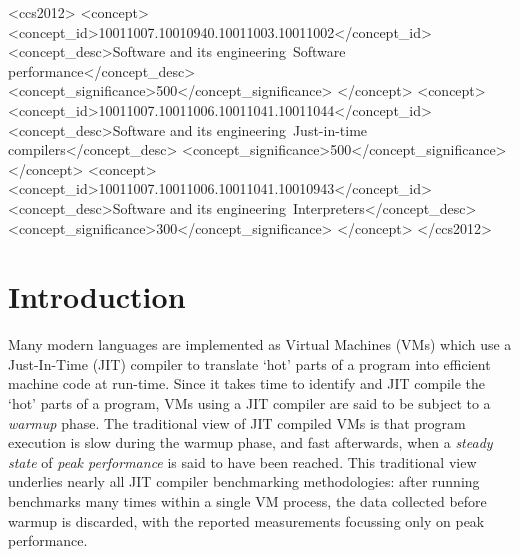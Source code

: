 \documentclass[acmsmall,screen]{acmart}
\begin{document}
\begin{CCSXML}
<ccs2012>
<concept>
<concept_id>10011007.10010940.10011003.10011002</concept_id>
<concept_desc>Software and its engineering~Software performance</concept_desc>
<concept_significance>500</concept_significance>
</concept>
<concept>
<concept_id>10011007.10011006.10011041.10011044</concept_id>
<concept_desc>Software and its engineering~Just-in-time compilers</concept_desc>
<concept_significance>500</concept_significance>
</concept>
<concept>
<concept_id>10011007.10011006.10011041.10010943</concept_id>
<concept_desc>Software and its engineering~Interpreters</concept_desc>
<concept_significance>300</concept_significance>
</concept>
</ccs2012>
\end{CCSXML}



\renewcommand{\shortauthors}{E.~Barrett, C.~F.~Bolz-Tereick, R.~Killick, S.~Mount, L.~Tratt}

\maketitle

\section{Introduction}
\label{sec:intro}

Many modern languages are implemented as Virtual Machines (VMs) which use a
Just-In-Time (JIT) compiler to translate `hot' parts of a program into efficient
machine code at run-time. Since it takes time to identify and JIT compile
the `hot' parts of a program, VMs using a JIT compiler are
said to be subject to a \emph{warmup} phase. The traditional view of
JIT compiled VMs is that program execution is slow during the warmup phase, and
fast afterwards, when a \emph{steady state} of \emph{peak performance} is said to have been reached.
This traditional view underlies nearly all JIT compiler benchmarking methodologies:
after running benchmarks many times within a single VM process, the
data collected before warmup is discarded, with the reported measurements
focussing only on peak performance.
\end{document}
